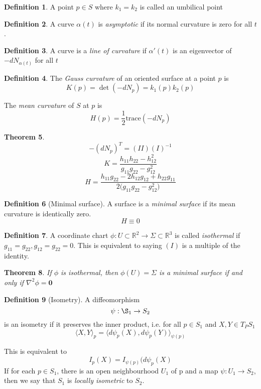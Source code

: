 \documentclass[10pt, oneside, reqno]{amsart}
\newcommand{\R}{\mathbb{R}}
\theoremstyle{plain}%
\newtheorem{thm}{Theorem}[section]
\theoremstyle{definition}
\newtheorem{defn}[thm]{Definition}
\theoremstyle{remark}
\begin{document}
\begin{defn}
	A point $p \in S$ where $k_1 = k_2$ is called an umbilical point
\end{defn}

\begin{defn}
	A curve $\alpha(t)$ is \emph{asymptotic} if its normal curvature is zero for all $t$.
\end{defn}

\begin{defn}
	A curve is a \emph{line of curvature} if $\alpha'(t)$ is an eigenvector of $-dN_{\alpha(t)}$ for all $t$
\end{defn}
\begin{defn}
	The \emph{Gauss curvature} of an oriented surface at a point $p$ is \[
		K(p) = \det(-dN_p) = k_1(p) k_2(p)
	\]
	
	The \emph{mean curvature} of $S$ at $p$ is \[
		H(p) = \frac{1}{2} \text{trace} (-dN_p)
	\]
\end{defn}


\begin{thm}
	\[
	-(dN_p)^T = (II)(I)^{-1}	
	\]
	\[
		K = \frac{h_{11}h_{22}-{h^2_{12}}}{g_{11}g_{22}-g^2_{12}}
	\]
	\[
		H = \frac{h_{11}g_{22}-2h_{12}g_{12}+h_{22}g_{11}}{2 ({g_{11}g_{22}-g^2_{12})}}
	\]
\end{thm}

\begin{defn}[Minimal surface]
	A surface is a \emph{minimal surface} if its mean curvature is identically zero. \[
		H \equiv 0
	\]
\end{defn}

\begin{defn}
	A coordinate chart $\phi: U \subset \R^2 \rightarrow \Sigma \subset \R^3$ is called \emph{isothermal} if $g_{11} = g_{22}, g_{12} = g_{22} = 0$.  This is equivalent to saying $(I)$ is a multiple of the identity.
\end{defn}

\begin{thm}
	If $\phi$ is isothermal, then $\phi(U) = \Sigma$ is a minimal surface if and only if $\nabla^2 \phi = \mathbf{0}$
\end{thm}

\begin{defn}[Isometry]
	A diffeomorphism \[
		\psi: \S_1 \rightarrow S_2 
	\]
	is an isometry if it preserves the inner product, i.e. for all $p \in S_1$ and $X,Y \in T_P S_1$ \[
		\langle X,Y \rangle_p = \langle d \psi_p(X),d \psi_p(Y) \rangle_{\psi(p)}
	\]
	
	This is equivalent to \[
		I_p(X) = I_{\psi(p)} (d\psi_p(X)
	\]
	If for each $p \in S_1$, there is an open neighbourhood $U_1$ of p and a map $\psi : U_1 \rightarrow S_2$, then we say that $S_1$ is \emph{locally isometric} to $S_2$.
\end{defn}
\end{document}
